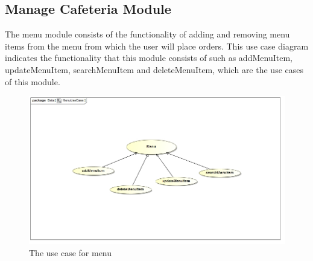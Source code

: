 \documentclass[a4paper,12pt]{article}
\begin{document}
\subsection{Manage Cafeteria Module}

The menu module consists of the functionality of adding and removing menu items from the menu from which the user will place orders. This use case diagram indicates the functionality that this module consists of such as addMenuItem, updateMenuItem, searchMenuItem and deleteMenuItem, which are the use cases of this module.

\begin{figure}[H]
  \centering
    \includegraphics[width=1.0\textwidth]{../images/MenuUseCase.jpg}
    \caption{The use case for menu} 
\end{figure}
\end{document}
